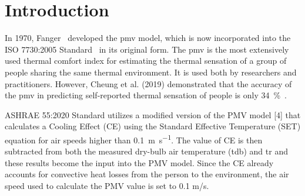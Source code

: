 

\section{Introduction}\label{sec:introduction}

    In 1970, Fanger~\cite{Fanger1970} developed the \ac{pmv} model, which is now incorporated into the ISO 7730:2005 Standard~\cite{iso7730} in its original form.
    The \ac{pmv} is the most extensively used thermal comfort index for estimating the thermal sensation of a group of people sharing the same thermal environment.
    It is used both by researchers and practitioners.
    However, Cheung et al. (2019) demonstrated that the accuracy of the \ac{pmv} in predicting self-reported thermal sensation of people is only \qty{34}{\percent}~\cite{Cheung2019}.

    ASHRAE 55:2020 Standard utilizes a modified version of the PMV model [4] that calculates a Cooling Effect (CE) using the Standard Effective Temperature (SET) equation for air speeds higher than \qty{0.1}{\m\per\s}.
    The value of CE is then subtracted from both the measured dry-bulb air temperature (tdb) and \ac{tr} and these results become the input into the PMV model.
    Since the CE already accounts for convective heat losses from the person to the environment, the air speed used to calculate the PMV value is set to 0.1 m/s.


